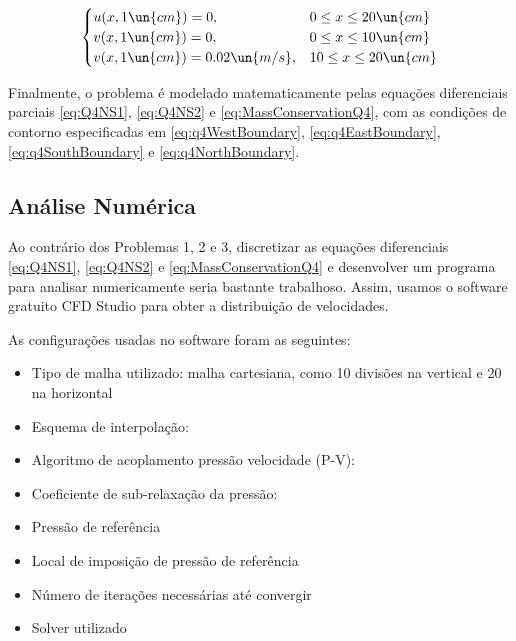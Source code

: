 \begin{equation}\label{eq:q4NorthBoundary}
    \begin{cases}
        u(x, 1 \un{cm}) = 0, & 0 \leq x \leq 20 \un{cm}  \\
        v(x, 1 \un{cm}) = 0, & 0 \leq x \leq 10 \un{cm}  \\
        v(x, 1 \un{cm}) = 0.02 \un{m/s}, & 10 \leq x \leq 20 \un{cm}  \\
    \end{cases}
\end{equation}

Finalmente, o problema é modelado matematicamente pelas equações diferenciais parciais
\eqref{eq:Q4NS1}, \eqref{eq:Q4NS2} e \eqref{eq:MassConservationQ4}, com as condições de 
contorno especificadas em \eqref{eq:q4WestBoundary}, \eqref{eq:q4EastBoundary}, 
\eqref{eq:q4SouthBoundary} e \eqref{eq:q4NorthBoundary}.

\subsection{Análise Numérica}

Ao contrário dos Problemas 1, 2 e 3, discretizar as equações diferenciais \eqref{eq:Q4NS1}, \eqref{eq:Q4NS2} e \eqref{eq:MassConservationQ4}
e desenvolver um programa para analisar numericamente seria bastante trabalhoso. Assim, 
usamos o software gratuito CFD Studio para obter a distribuição de velocidades. 

As configurações usadas no software foram as seguintes:

\begin{itemize}
    \item Tipo de malha utilizado: malha cartesiana, como 10 divisões na vertical e 20 na horizontal
    \item Esquema de interpolação:
    \item Algoritmo de acoplamento pressão velocidade (P-V): 
    \item Coeficiente de sub-relaxação da pressão:
    \item Pressão de referência
    \item Local de imposição de pressão de referência
    \item Número de iterações necessárias até convergir
    \item Solver utilizado
\end{itemize}



